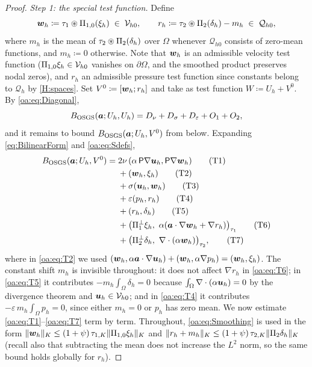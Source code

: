 \begin{proof}
\medskip\noindent\emph{Step 1: the special test function.}
Define
\[
  \boldsymbol{w}_h \coloneqq \tau_1 \circledast \Pi_{1,0}(\xi_h) \;\in\; \mathcal{V}_{h0},
  \qquad
  r_h \coloneqq \tau_2 \circledast \Pi_{2}(\delta_h) - m_h \;\in\; \mathcal{Q}_{h0},
\]
where $m_h$ is the mean of $\tau_2\circledast\Pi_{2}(\delta_h)$ over $\Omega$ whenever
$\mathcal{Q}_{h0}$ consists of zero-mean functions, and $m_h \coloneqq 0$ otherwise. Note that
$\boldsymbol{w}_h$ is an admissible velocity test function ($\Pi_{1,0}\xi_h \in \mathcal{V}_{h0}$ vanishes on
$\partial\Omega$, and the smoothed product preserves nodal zeros), and $r_h$ an
admissible pressure test function since constants belong to $\mathcal{Q}_h$ by \cref{H:spaces}. Set
$V^0 \coloneqq [\boldsymbol{w}_h; r_h]$ and take as test function $W \coloneqq U_h + V^0$.
By \cref{oa:eq:Diagonal},
\begin{equation}
  \label{oa:eq:StepDiag}
  B_{\mathrm{OSGS}}(\boldsymbol{a}; U_h, U_h) = D_\nu + D_\sigma + D_\varepsilon + O_1 + O_2 ,
\end{equation}
and it remains to bound $B_{\mathrm{OSGS}}(\boldsymbol{a}; U_h, V^0)$ from below. Expanding
\cref{eq:BilinearForm} and \cref{oa:eq:Sdefs},
\begin{align}
  B_{\mathrm{OSGS}}(\boldsymbol{a}; U_h, V^0)
  ={}& 2\nu\,(\alpha\,\mathsf{P}\nabla\boldsymbol{u}_h, \mathsf{P}\nabla\boldsymbol{w}_h)
  \tag{T1}\label{oa:eq:T1}\\
  &+ (\boldsymbol{w}_h, \xi_h)
  \tag{T2}\label{oa:eq:T2}\\
  &+ \sigma(\boldsymbol{u}_h, \boldsymbol{w}_h)
  \tag{T3}\label{oa:eq:T3}\\
  &+ \varepsilon(p_h, r_h)
  \tag{T4}\label{oa:eq:T4}\\
  &+ (r_h, \delta_h)
  \tag{T5}\label{oa:eq:T5}\\
  &+ \bigl(\Pi_{1}^{\perp}\xi_h,\ \alpha(\boldsymbol{a}\cdot\nabla\boldsymbol{w}_h + \nabla r_h)\bigr)_{\tau_1}
  \tag{T6}\label{oa:eq:T6}\\
  &+ \bigl(\Pi_{2}^{\perp}\delta_h,\ \nabla\cdot(\alpha\boldsymbol{w}_h)\bigr)_{\tau_2},
  \tag{T7}\label{oa:eq:T7}
\end{align}
where in \cref{oa:eq:T2} we used
$(\boldsymbol{w}_h, \alpha\boldsymbol{a}\cdot\nabla\boldsymbol{u}_h) + (\boldsymbol{w}_h, \alpha\nabla p_h) = (\boldsymbol{w}_h, \xi_h)$.
The constant shift $m_h$ is invisible throughout: it does not affect $\nabla r_h$ in
\cref{oa:eq:T6}; in \cref{oa:eq:T5} it contributes $-m_h\int_\Omega \delta_h = 0$ because
$\int_\Omega \nabla\cdot(\alpha\boldsymbol{u}_h) = 0$ by the divergence theorem and
$\boldsymbol{u}_h \in \mathcal{V}_{h0}$; and in \cref{oa:eq:T4} it contributes
$-\varepsilon\, m_h \int_\Omega p_h = 0$, since either $m_h = 0$ or $p_h$ has zero
mean. We now estimate \cref{oa:eq:T1}--\cref{oa:eq:T7} term by term. Throughout,
\cref{oa:eq:Smoothing} is used in the form
$\lVert \boldsymbol{w}_h \rVert_{K} \le (1+\psi)\,\tau_{1,K}\lVert \Pi_{1,0}\xi_h \rVert_{K}$ and
$\lVert r_h + m_h \rVert_{K} \le (1+\psi)\,\tau_{2,K}\lVert \Pi_{2}\delta_h \rVert_{K}$ (recall also that
subtracting the mean does not increase the $L^2$ norm, so the same bound holds
globally for $r_h$).


\end{proof}
